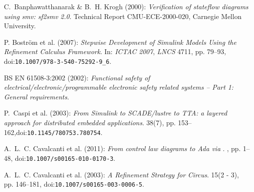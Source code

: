 \documentclass[submission]{eptcs}
\begin{document}

\begin{thebibliography}{10}
\providecommand{\bibitemdeclare}[2]{}
\providecommand{\urlprefix}{Available at }
\providecommand{\url}[1]{\texttt{#1}}
\providecommand{\href}[2]{\texttt{#2}}
\providecommand{\urlalt}[2]{\href{#1}{#2}}
\providecommand{\doi}[1]{doi:\urlalt{http://dx.doi.org/#1}{#1}}
\providecommand{\bibinfo}[2]{#2}

\bibitemdeclare{techreport}{Banphawatthanarak2000}
\bibinfo{author}{C.~Banphawatthanarak} \& \bibinfo{author}{B.~H. Krogh}
  (\bibinfo{year}{2000}): \emph{\bibinfo{title}{Verification of stateflow
  diagrams using smv: sf2smv 2.0}}.
\newblock \bibinfo{type}{Technical Report} \bibinfo{number}{CMU-ECE-2000-020},
  \bibinfo{institution}{Carnegie Mellon University}.

\bibitemdeclare{incollection}{Bostrom2007}
\bibinfo{author}{P. Bostr\"om et al.} (\bibinfo{year}{2007}):
  \emph{\bibinfo{title}{Stepwise Development of Simulink Models Using the
  Refinement Calculus Framework}}.
\newblock In: {\sl \bibinfo{booktitle}{ICTAC 2007}}, {\sl
  \bibinfo{series}{LNCS}} \bibinfo{volume}{4711}, pp. \bibinfo{pages}{79--93},
  \doi{10.1007/978-3-540-75292-9\_6}.

\bibitemdeclare{}{BS2002}
\bibinfo{author}{{BS EN 61508-3:2002}} (\bibinfo{year}{2002}):
  \emph{\bibinfo{title}{Functional safety of electrical/electronic/programmable
  electronic safety related systems -- {P}art 1: {G}eneral requirements}}.

\bibitemdeclare{article}{Caspi2003}
\bibinfo{author}{P.~Caspi et al.}
  (\bibinfo{year}{2003}): \emph{\bibinfo{title}{From Simulink to {SCADE/lustre}
  to {TTA}: a layered approach for distributed embedded applications}}.
\newblock {\sl \bibinfo{journal}{ACM SIGPLAN Notices}}
  \bibinfo{volume}{38}(\bibinfo{number}{7}), pp. \bibinfo{pages}{153--162},\doi{10.1145/780753.780754}.

\bibitemdeclare{article}{Cavalcanti2011}
\bibinfo{author}{A.~L.~C. Cavalcanti et al.} (\bibinfo{year}{2011}):
  \emph{\bibinfo{title}{From control law diagrams to Ada via {\Circus}}}.
\newblock {\sl \bibinfo{journal}{FAC}} , pp.
  \bibinfo{pages}{1--48}, \doi{10.1007/s00165-010-0170-3}.

\bibitemdeclare{article}{Cavalcanti2003a}
\bibinfo{author}{A.~L.~C. Cavalcanti et al.} (\bibinfo{year}{2003}):
  \emph{\bibinfo{title}{{A Refinement Strategy for {\sf\textsl{Circus}}}}}.
\newblock {\sl \bibinfo{journal}{FAC}} \bibinfo{volume}{15}(\bibinfo{number}{2
  - 3}), pp. \bibinfo{pages}{146--181}, \doi{10.1007/s00165-003-0006-5}.


\end{thebibliography}
\end{document}
